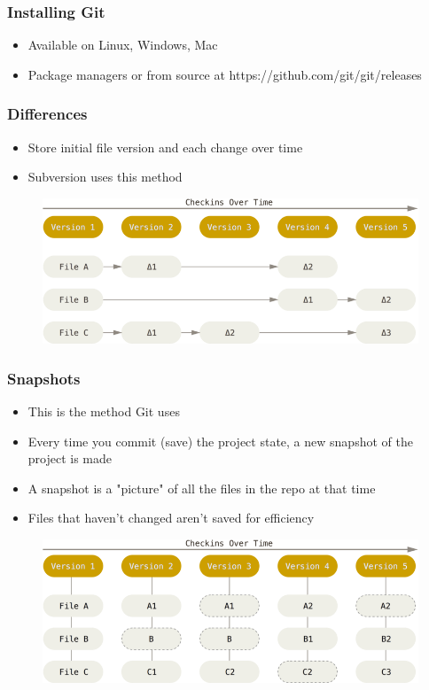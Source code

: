 \documentclass{beamer}
\begin{document}
\begin{frame}
	\frametitle{Installing Git}
	\begin{itemize}
		\item{Available on Linux, Windows, Mac}
		\item{Package managers or from source at https://github.com/git/git/releases}
	\end{itemize}

\end{frame}

\begin{frame}
	\frametitle{Differences}
	\begin{itemize}
		\item{Store initial file version and each change over time}
		\item{Subversion uses this method}
	\end{itemize}
	\begin{figure}
		\includegraphics[scale=0.3]{Differences-0.png}
	\end{figure}

\end{frame}

\begin{frame}
	\frametitle{Snapshots}
	\begin{itemize}
		\item{This is the method Git uses}
		\item{Every time you commit (save) the project state, a new snapshot of the project is made}
		\item{A snapshot is a "picture" of all the files in the repo at that time}
		\item{Files that haven't changed aren't saved for efficiency}
	\end{itemize}
	\begin{figure}
		\includegraphics[scale=0.3]{Snapshots-0.png}
	\end{figure}

\end{frame}
\end{document}
